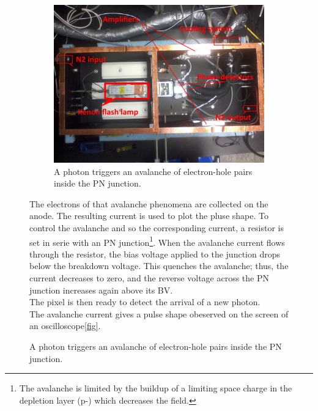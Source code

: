 \begin{figure}[!hbtp]
  \centering
  \begin{figure}[!hbtp]  
    \includegraphics[totalheight=.35\textwidth,trim=0cm 7cm 0cm 2.5cm, clip=true,]{../Pictures/blabla/box.jpg}
    \caption{A photon triggers an avalanche of electron-hole pairs inside the PN junction.}
    \label{fig:avalanche}
  \end{figure}
  
  The electrons of that avalanche phenomena are collected on the anode. The resulting current is used to plot the  pluse shape. 
  To control the avalanche and so the corresponding current, a resistor is set in serie with an PN junction\footnote{The avalanche 
  is limited by the buildup of a limiting space charge in the depletion layer (p-) which decreases the field.}. 
  When the avalanche current flows through the resistor, the bias voltage applied to the junction drops below the breakdown voltage. 
  This quenches the avalanche; thus, the current decreases to zero, and the reverse voltage across the PN junction increases again above 
  its BV.
  \\
  
  The pixel is then ready to detect the arrival of a new photon.\\
  The avalanche current gives a pulse shape obeserved on the screen of an oscilloscope\ref{fig}.
  
  


\end{figure}

